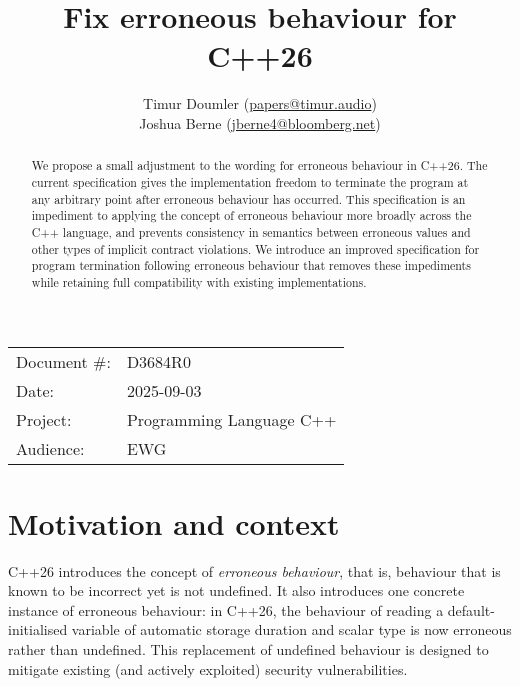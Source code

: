 

 \usepackage[bottom]{footmisc} 



\title{Fix erroneous behaviour for C++26}
\author{
  Timur Doumler \small(\href{mailto:papers@timur.audio}{papers@timur.audio}) \\
  Joshua Berne \small(\href{mailto:jberne4@bloomberg.net}{jberne4@bloomberg.net}) 
}
\date{}
\maketitle

\begin{tabular}{ll}
Document \#: & D3684R0 \\
Date: &2025-09-03 \\
Project: & Programming Language C++ \\
Audience: & EWG
\end{tabular}

\begin{abstract}
We propose a small adjustment to the wording for erroneous behaviour in C++26. The current specification gives the implementation  freedom to terminate the program at any arbitrary point after erroneous behaviour has occurred. This specification is an impediment to applying the concept of erroneous behaviour more broadly across the C++ language, and prevents consistency in semantics between erroneous values and other types of implicit contract violations. We introduce an improved specification for program termination following erroneous behaviour that removes these impediments while retaining full compatibility with existing implementations.
\end{abstract}


\section{Motivation and context}

C++26 introduces the concept of \emph{erroneous behaviour}, that is, behaviour that is known to be incorrect yet is not undefined. It also introduces one concrete instance of erroneous behaviour: in C++26, the behaviour of reading a default-initialised variable of automatic storage duration and scalar type is now erroneous rather than undefined. This replacement of undefined behaviour is designed to mitigate existing (and actively exploited) security vulnerabilities.

